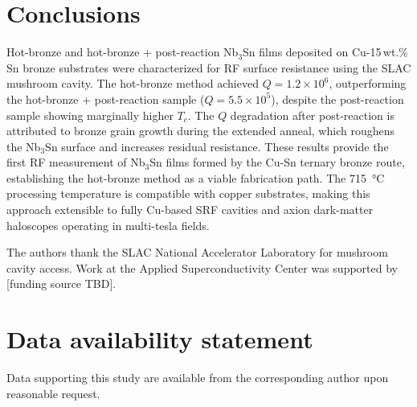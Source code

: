 \documentclass{iopjournal}
\begin{document}
\section{Conclusions}

Hot-bronze and hot-bronze + post-reaction Nb$_3$Sn films deposited on Cu-15\,wt.\%\,Sn bronze substrates were characterized for RF surface resistance using the SLAC mushroom cavity. The hot-bronze method achieved $Q = 1.2 \times 10^6$, outperforming the hot-bronze + post-reaction sample ($Q = 5.5 \times 10^5$), despite the post-reaction sample showing marginally higher $T_c$. The $Q$ degradation after post-reaction is attributed to bronze grain growth during the extended anneal, which roughens the Nb$_3$Sn surface and increases residual resistance. These results provide the first RF measurement of Nb$_3$Sn films formed by the Cu-Sn ternary bronze route, establishing the hot-bronze method as a viable fabrication path. The \qty{715}{\degreeCelsius} processing temperature is compatible with copper substrates, making this approach extensible to fully Cu-based SRF cavities and axion dark-matter haloscopes operating in multi-tesla fields.

\ack
The authors thank the SLAC National Accelerator Laboratory for mushroom cavity access. Work at the Applied Superconductivity Center was supported by [funding source TBD].

\section*{Data availability statement}
Data supporting this study are available from the corresponding author upon reasonable request.

\printbibliography
\end{document}
